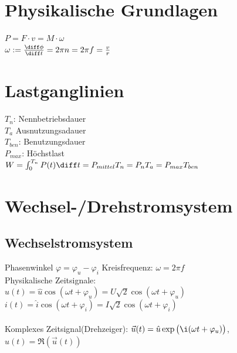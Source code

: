 \documentclass[european]{latex4ei_sheet}
\begin{document}
\ifdefined\GitRevision{}\fi

\maketitle


	\section{Physikalische Grundlagen}
	$P = F \cdot v = M \cdot \omega$ \\
	$\omega := \frac{\diff \phi}{\diff t} = 2 \pi n = 2 \pi f = \frac{v}{r}$ \\


	\section{Lastganglinien}
	$T_n$: Nennbetriebsdauer\\
	$T_a$ Ausnutzungsadauer\\
	$T_{ben}$: Benutzungsdauer\\
	$P_{max}$: Höchstlast\\
	$W = \int_0^{T_n} P(t) \diff t = P_{mittel} T_n = P_n T_a = P_{max} T_{ben}$\\
	
	\section{Wechsel-/Drehstromsystem}


		\subsection{Wechselstromsystem}
		Phasenwinkel $\varphi = \varphi_u - \varphi_i$ \qquad Kreisfrequenz: $\omega = 2\pi f$\\
		
		
		Physikalische Zeitsignale:\\
		$u(t) = \hat u \cos(\omega t + \varphi_u) = U \sqrt{2} \cos(\omega t + \varphi_u)$\\
		$i(t) = \hat i \cos(\omega t + \varphi_i) = I \sqrt{2} \cos(\omega t + \varphi_i)$\\
		\\
		Komplexes Zeitsignal(Drehzeiger): $\vec u(t) = \hat u \exp\big(\i (\omega t + \varphi_u)\big)$, 
		$u(t) = \Re(\vec u(t))$\\
		
\end{document}
